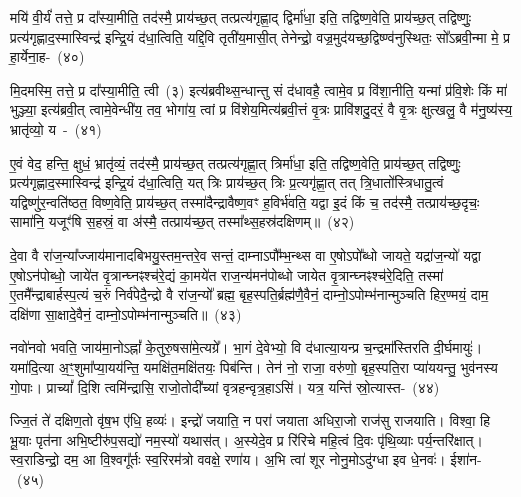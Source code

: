 मयि॑ वी॒र्यं॑ तत्ते॒ प्र दा᳚स्या॒मीति॒ तद॑स्मै॒ प्राय॑च्छ॒त् तत्प्रत्य॑\-गृह्णा॒द् द्विर्मा॑धा॒ इति॒ तद्विष्ण॒वेति॒ प्राय॑च्छ॒त् तद्विष्णुः॒ प्रत्य॑\-गृह्णाद॒स्मास्विन्द्र॑ इन्द्रि॒यं द॑धा॒त्विति॒ यद्दि॒वि तृती॑य॒मासी॒त् तेनेन्द्रो॒ वज्र॒मुद॑यच्छ॒द्विष्ण्व॑नुस्थितः॒ सो᳚\-ऽब्रवी॒न्मा मे॒ प्र हा॒र्येना॒ह-~(४०)

मि॒दमस्मि॒ तत्ते॒ प्र दा᳚स्या॒मीति॒ त्वी~(३) इत्य॑ब्रवीथ्स॒न्धान्तु सं द॑धावहै॒ त्वामे॒व प्र वि॑शा॒नीति॒ यन्मां प्र॑वि॒शेः किं मा॑ भुञ्ज्या॒ इत्य॑ब्रवी॒त् त्वामे॒वेन्धी॑य॒ तव॒ भोगा॑य॒ त्वां प्र वि॑शेय॒मित्य॑ब्रवी॒त्तं वृ॒त्रः प्रावि॑शदु॒दरं॒ वै वृ॒त्रः क्षुत्खलु॒ वै म॑नु॒ष्य॑स्य॒ भ्रातृ॑व्यो॒ य~-~(४१)

ए॒वं वेद॒ हन्ति॒ क्षुधं॒ भ्रातृ॑व्यं॒ तद॑स्मै॒ प्राय॑च्छ॒त् तत्प्रत्य॑\-गृह्णा॒त् त्रिर्मा॑धा॒ इति॒ तद्विष्ण॒वेति॒ प्राय॑च्छ॒त् तद्विष्णुः॒ प्रत्य॑\-गृह्णाद॒स्मास्विन्द्र॑ इन्द्रि॒यं द॑धा॒त्विति॒ यत् त्रिः प्राय॑च्छ॒त् त्रिः प्र॒त्यगृ॑ह्णा॒त् तत् त्रि॒धातो᳚स्त्रिधातु॒त्वं यद्विष्णु॑र॒न्वति॑ष्ठत॒ विष्ण॒वेति॒ प्राय॑च्छ॒त् तस्मा॑दैन्द्रा\-वैष्ण॒वꣳ ह॒विर्भ॑वति॒ यद्वा इ॒दं किं च॒ तद॑स्मै॒ तत्प्राय॑च्छ॒दृचः॒ सामा॑नि॒ यजूꣳ॑षि स॒हस्रं॒ वा अ॑स्मै॒ तत्प्राय॑च्छ॒त् तस्मा᳚थ्स॒हस्र॑द\-क्षिणम्॥~(४२)

{\anuvakamend[{प्र॒व॒णं विष्णु॒र्वा इ॒दमि॒दम॒हं यो भ॑व॒त्येक॑विꣳशतिश्च}]}%

दे॒वा वै रा॑ज॒न्या᳚ज्जाय॑मानादबिभयु॒स्तम॒न्तरे॒व सन्तं॒ दाम्ना\-ऽपौ᳚म्भ॒न्थ्स वा ए॒षो\-ऽपो᳚ब्धो जायते॒ यद्रा॑ज॒न्यो॑ यद्वा ए॒षो\-ऽन॑पोब्धो॒ जाये॑त वृ॒त्रान्घ्नꣴश्च॑रे॒द्यं का॒मये॑त राज॒न्य॑मन॑पोब्धो जायेत वृ॒त्रान्घ्नꣴश्च॑रे॒दिति॒ तस्मा॑ ए॒तमै᳚न्द्राबार्\mbox{}हस्प॒त्यं च॒रुं निर्व॑पेदै॒न्द्रो वै रा॑ज॒न्यो᳚ ब्रह्म॒ बृह॒स्पति॒र्ब्रह्म॑णै॒वैनं॒ दाम्नो॒\-ऽपोम्भ॑नान्मुञ्चति हिर॒ण्मयं॒ दाम॒ दक्षि॑णा सा॒क्षादे॒वैनं॒ दाम्नो॒\-ऽपोम्भ॑नान्मुञ्चति॥~(४३)

{\anuvakamend[{ए॒नं॒ द्वाद॑श च}]}%

नवो॑नवो भवति॒ जाय॑मा॒नो\-ऽह्नां᳚ के॒तुरु॒षसा॑मे॒त्यग्रे᳚। भा॒गं दे॒वे\-भ्यो॒ वि द॑धात्या॒यन्प्र च॒न्द्रमा᳚स्तिरति दी॒र्घमायुः॑। यमा॑दि॒त्या अ॒ꣳ॒शुमा᳚\-प्या॒यय॑न्ति॒ यमक्षि॑त॒मक्षि॑तयः॒ पिब॑न्ति। तेन॑ नो॒ राजा॒ वरु॑णो॒ बृह॒स्पति॒रा प्या॑ययन्तु॒ भुव॑नस्य गो॒पाः। प्राच्यां᳚ दि॒शि त्वमि॑न्द्रासि॒ राजो॒तोदी᳚च्यां वृत्रहन्वृत्र॒हा\-ऽसि॑। यत्र॒ यन्ति॑ स्रो॒त्यास्त-~(४४)

ज्जि॒तं ते॑ दक्षिण॒तो वृ॑ष॒भ ए॑धि॒ हव्यः॑। इन्द्रो॑ जयाति॒ न परा॑ जयाता अधिरा॒जो राज॑सु राजयाति। विश्वा॒ हि भू॒याः पृत॑ना अभि॒ष्टीरु॑प॒सद्यो॑ नम॒स्यो॑ यथास॑त्। अ॒स्येदे॒व प्र रि॑रिचे महि॒त्वं दि॒वः पृ॑थि॒व्याः पर्य॒न्तरि॑क्षात्। स्व॒राडिन्द्रो॒ दम॒ आ वि॒श्वगू᳚र्तः स्व॒रिरम॑त्रो ववक्षे॒ रणा॑य। अ॒भि त्वा॑ शूर नोनु॒मो\-ऽदु॑ग्धा इव धे॒नवः॑। ईशा॑न-~(४५)

